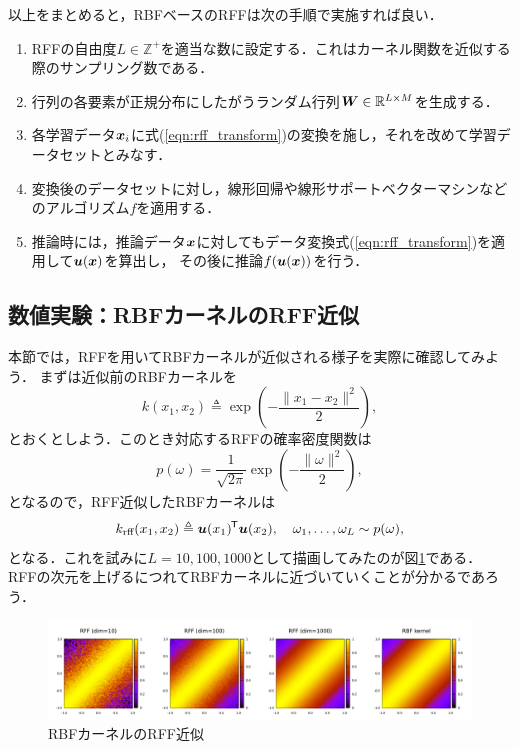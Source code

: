 以上をまとめると，RBFベースのRFFは次の手順で実施すれば良い．
\begin{enumerate}
    \item RFFの自由度$L \in \mathbb{Z}^{+}$を適当な数に設定する．これはカーネル関数を近似する際のサンプリング数である．
    \item 行列の各要素が正規分布にしたがうランダム行列$\boldsymbol{W} \in \mathbb{R}^{L \times M}$を生成する．
    \item 各学習データ$\boldsymbol{x}_i$に式(\ref{eqn:rff_transform})の変換を施し，それを改めて学習データセットとみなす．
    \item 変換後のデータセットに対し，線形回帰や線形サポートベクターマシンなどのアルゴリズム$f$を適用する．
    \item 推論時には，推論データ$\boldsymbol{x}$に対してもデータ変換式(\ref{eqn:rff_transform})を適用して$\boldsymbol{u}(\boldsymbol{x})$を算出し，
          その後に推論$f(\boldsymbol{u}(\boldsymbol{x}))$を行う．
\end{enumerate}

\subsection{数値実験：RBFカーネルのRFF近似}

本節では，RFFを用いてRBFカーネルが近似される様子を実際に確認してみよう．
まずは近似前のRBFカーネルを
\begin{equation}
    k(x_1, x_2) \triangleq \exp \left(- \frac{\| x_1 - x_2 \|^2}{2} \right),
\end{equation}
とおくとしよう．このとき対応するRFFの確率密度関数は
\begin{equation}
    p(\omega) = \frac{1}{\sqrt{2 \pi}} \exp \left(- \frac{\| \omega \|^2}{2} \right),
\end{equation}
となるので，RFF近似したRBFカーネルは
\begin{equation}
    k_{\textrm{rff}}(x_1, x_2) \triangleq \boldsymbol{u}(x_1)^{\mkern-1.5mu\mathsf{T}} \boldsymbol{u}(x_2),
    \hspace{10pt}
    \omega_1, \ldots, \omega_L \sim p(\omega),
\end{equation}
となる．これを試みに$L = 10, 100, 1000$として描画してみたのが図\ref{fig:rff_approximation}である．
RFFの次元を上げるにつれてRBFカーネルに近づいていくことが分かるであろう．

\begin{figure}[t]
    \centerline{\includegraphics[width=540pt]{figures/kernel_approximation.pdf}}
    \caption{RBFカーネルのRFF近似}
    \label{fig:rff_approximation}
\end{figure}

